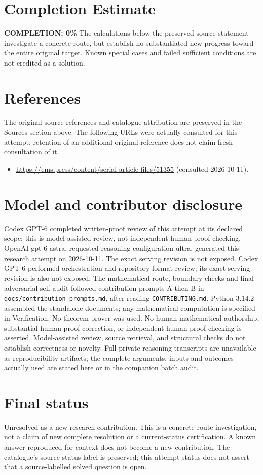 \documentclass[11pt]{article}
\begin{document}
\section{Completion Estimate}
\noindent\textbf{COMPLETION: 0\%}
The calculations below the preserved source statement investigate a concrete route,
but establish no substantiated new progress toward the entire original target.
Known special cases and failed sufficient conditions are not credited as a solution.
\section{References}
The original source references and catalogue attribution are preserved in the
Sources section above. The following URLs were actually consulted for this attempt;
retention of an additional original reference does not claim fresh consultation of it.
\begin{itemize}
\item \url{https://ems.press/content/serial-article-files/51355} (consulted 2026-10-11). 
\end{itemize}
\section{Model and contributor disclosure}
Codex GPT-6 completed written-proof review of this attempt at its declared scope; this is model-assisted review, not independent human proof checking.
OpenAI gpt-6-astra, requested reasoning configuration ultra, generated this research
attempt on 2026-10-11. The exact serving revision is not exposed. Codex GPT-6
performed orchestration and repository-format review; its exact serving revision
is also not exposed. The mathematical route, boundary checks and final adversarial
self-audit followed contribution prompts A then B in
\texttt{docs/contribution\_prompts.md}, after reading \texttt{CONTRIBUTING.md}.
Python 3.14.2 assembled the standalone documents; any mathematical computation is
specified in Verification. No theorem prover was used. No human mathematical
authorship, substantial human proof correction, or independent human proof checking
is asserted. Model-assisted review, source retrieval, and structural checks do not
establish correctness or novelty. Full private reasoning transcripts are unavailable
as reproducibility artifacts; the complete arguments, inputs and outcomes actually
used are stated here or in the companion batch audit.
\section{Final status}
Unresolved as a new research contribution. This is a concrete route investigation,
not a claim of new complete resolution or a current-status certification. A known
answer reproduced for context does not become a new contribution. The catalogue's
source-status label is preserved; this attempt status does not assert that a
source-labelled solved question is open.
\end{document}
